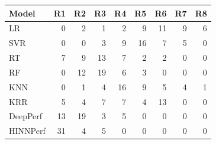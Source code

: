 \begin{tabular}{lrrrrrrrr}
\toprule
Model & R1 & R2 & R3 & R4 & R5 & R6 & R7 & R8 \\
\midrule
LR & 0 & 2 & 1 & 2 & 9 & 11 & 9 & 6 \\
SVR & 0 & 0 & 3 & 9 & 16 & 7 & 5 & 0 \\
RT & 7 & 9 & 13 & 7 & 2 & 2 & 0 & 0 \\
RF & 0 & 12 & 19 & 6 & 3 & 0 & 0 & 0 \\
KNN & 0 & 1 & 4 & 16 & 9 & 5 & 4 & 1 \\
KRR & 5 & 4 & 7 & 7 & 4 & 13 & 0 & 0 \\
DeepPerf & 13 & 19 & 3 & 5 & 0 & 0 & 0 & 0 \\
HINNPerf & 31 & 4 & 5 & 0 & 0 & 0 & 0 & 0 \\
\bottomrule
\end{tabular}
